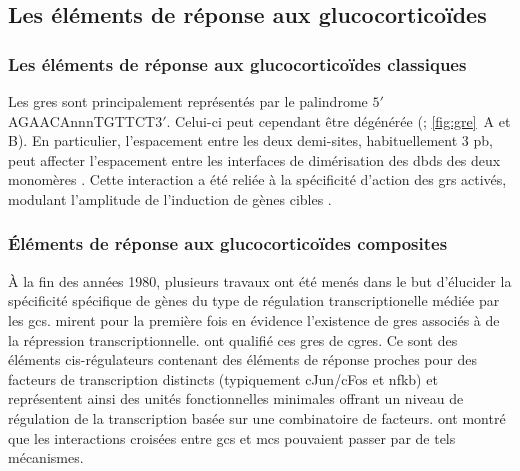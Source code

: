 \documentclass[../main.tex]{subfiles}
\begin{document}
\subsection{Les éléments de réponse aux glucocorticoïdes}

\subsubsection{Les éléments de réponse aux glucocorticoïdes classiques}
Les \glspl{gre} sont principalement représentés par le palindrome $5\prime$AGAACAnnnTGTTCT$3\prime$.
Celui-ci peut cependant être dégénérée (\citealp{Nordeen1990}; \autoref{fig:gre}~A et B).
En particulier, l'espacement entre les deux demi-sites, habituellement 3 \gls{pb}, peut affecter l'espacement entre les interfaces de dimérisation des \glspl{dbd} des deux monomères \citep{Watson2013}.
Cette interaction a été reliée à la spécificité d'action des \glspl{gr} activés, modulant l'amplitude de l'induction de gènes cibles \citep{Meijsing2009}.
	


\subsubsection{Éléments de réponse aux glucocorticoïdes composites}
À la fin des années 1980, plusieurs travaux ont été menés dans le but d'élucider la spécificité spécifique de gènes du type de régulation transcriptionelle médiée par les \glspl{gc}.
\citet{Sakai1988} mirent pour la première fois en évidence l'existence de \glspl{gre} associés à de la répression transcriptionnelle.
\citet{Diamond1990} ont qualifié ces \glspl{gre} de \glspl{cgre}.
Ce sont des éléments cis-régulateurs contenant des éléments de réponse proches pour des facteurs de transcription distincts (typiquement cJun/cFos et \gls{nfkb}) et représentent ainsi des unités fonctionnelles minimales offrant un niveau de régulation de la transcription basée sur une combinatoire de facteurs.
\citet{Pearce1993} ont montré que les interactions croisées entre \glspl{gc} et \glspl{mc} pouvaient passer par de tels mécanismes.
\end{document}
